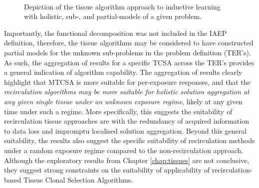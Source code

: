 \begin{figure}[htp]
{\begin{minipage}[t]{0.30\textwidth}
	\end{minipage}}%
	\hfill
		\\
	\caption{Depiction of the tissue algorithm approach to inductive learning with holistic, sub-, and partial-models of a given problem.}
	\label{fig:mapping:tissue:models} %
\end{figure}

Importantly, the functional decomposition was not included in the IAEP definition, therefore, the tissue algorithms may be considered to have constructed partial models for the unknown sub-problems in the problem definition (TER's). As such, the aggregation of results for a specific TCSA across the TER's provides a general indication of algorithm capability. The aggregation of results clearly highlight that MTCSA is more suitable for per-exposure responses, and that the \emph{recirculation algorithms may be more suitable for holistic solution aggregation at any given single tissue under an unknown exposure regime}, likely at any given time under such a regime. More specifically, this suggests the suitability of recirculation tissue approaches are with the redundancy of acquired information to data loss and impromptu localised solution aggregation.
Beyond this general suitability, the results also suggest the specific suitability of recirculation methods under a random exposure regime compared to the non-recirculation approach. Although the exploratory results from Chapter \ref{chap:tissues} are not conclusive, they suggest strong constraints on the suitability of applicability of recirculation-based Tissue Clonal Selection Algorithms.


